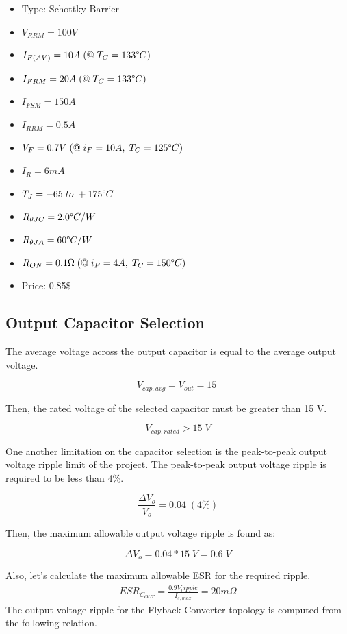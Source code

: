 \begin{itemize}
    \item Type: Schottky Barrier
    \item $V_{RRM} = 100V$
    \item $I_{F(AV)} = 10A\; (@\; T_C = 133\degree C)$
    \item $I_{FRM} = 20A\; (@\; T_C = 133\degree C)$
    \item $I_{FSM} = 150A$
    \item $I_{RRM} = 0.5A$
    \item $V_F = 0.7V\;(@\;i_F = 10A,\; T_C = 125\degree C)$
    \item $I_R = 6mA$
    \item $T_J = -65\;to\;+175\degree C$
    \item $R_{\theta JC} = 2.0\degree C/W$
    \item $R_{\theta JA} = 60\degree C/W$
    \item $R_{ON} = 0.1\ohm\;(@\;i_F = 4A,\;T_C = 150\degree C)$
    \item Price: 0.85\$
\end{itemize}

\subsection{Output Capacitor Selection}
The average voltage across the output capacitor is equal to the average output voltage.

$$ V_{cap,avg} = V_{out} = 15\; $$

Then, the rated voltage of the selected capacitor must be greater than 15 V.

$$ V_{cap,rated} > 15\;V $$

One another limitation on the capacitor selection is the peak-to-peak output voltage ripple limit of the project. The peak-to-peak output voltage ripple is required to be less than 4\%.

$$ \frac{\Delta V_o }{V_o} = 0.04\;(4\%) $$

Then, the maximum allowable output voltage ripple is found as:

$$ \Delta V_o = 0.04*15\;V = 0.6\;V $$ 

Also, let's calculate the maximum allowable ESR for the required ripple.
\begin{align*}
    ESR_{C_{OUT}}=\frac{0.9V_ripple}{I_{s,max}}=20m\Omega
\end{align*}
The output voltage ripple for the Flyback Converter topology is computed from the following relation.

